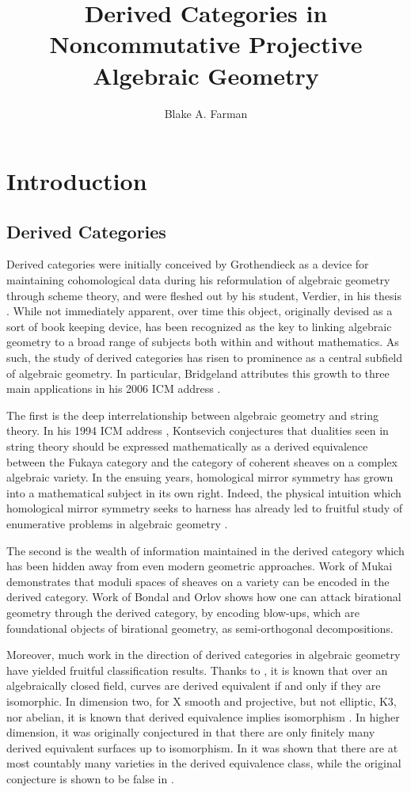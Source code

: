 \documentclass[11pt]{amsart}
\title{Derived Categories in Noncommutative Projective Algebraic Geometry}
\author{Blake A. Farman}
\date{}
\begin{document}
\maketitle

\section*{Introduction}
\subsection*{Derived Categories}
Derived categories were initially conceived by Grothendieck as a device for maintaining cohomological data during his reformulation of algebraic geometry through scheme theory, and were fleshed out by his student, Verdier, in his thesis \cite{Verdier}.
While not immediately apparent, over time this object, originally devised as a sort of book keeping device, has been recognized as the key to linking algebraic geometry to a broad range of subjects both within and without mathematics.
As such, the study of derived categories has risen to prominence as a central subfield of algebraic geometry.
In particular, Bridgeland attributes this growth to three main applications in his 2006 ICM address \cite{Bridgeland06}.

The first is the deep interrelationship between algebraic geometry and string theory.
In his 1994 ICM address \cite{Kontsevich}, Kontsevich conjectures that dualities seen in string theory should be expressed mathematically as a derived equivalence between the Fukaya category and the category of coherent sheaves on a complex algebraic variety.
In the ensuing years, homological mirror symmetry has grown into a mathematical subject in its own right.
Indeed, the physical intuition which homological mirror symmetry seeks to harness has already led to fruitful study of enumerative problems in algebraic geometry \cite{enumerative}.

The second is the wealth of information maintained in the derived category which has been hidden away from even modern geometric approaches.
Work of Mukai \cite{Mukai81,Mukai87} demonstrates that moduli spaces of sheaves on a variety can be encoded in the derived category.
Work of Bondal and Orlov \cite{Bondal-Orlov} shows how one can attack birational geometry through the derived category, by encoding blow-ups, which are foundational objects of birational geometry, as semi-orthogonal decompositions.

Moreover, much work in the direction of derived categories in algebraic geometry have yielded fruitful classification results.
Thanks to \cite{Orlov1997}, it is known that over an algebraically closed field, curves are derived equivalent if and only if they are isomorphic.
In dimension two, for X smooth and projective, but not elliptic, K3, nor abelian, it is known that derived equivalence implies isomorphism \cite[Prop. 12.1]{HuyFMT}.
In higher dimension, it was originally conjectured in \cite{kawamata2002} that there are only finitely many derived equivalent surfaces up to isomorphism.
In \cite{AnToe} it was shown that there are at most countably many varieties in the derived equivalence class, while the original conjecture is shown to be false in \cite{lesieutre2014}.
\end{document}
